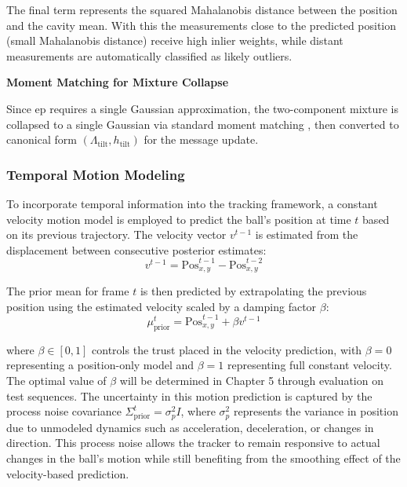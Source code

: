 \documentclass[12pt,a4paper]{article}
\begin{document}
The final term represents the squared Mahalanobis distance between the position and the cavity mean. With this the measurements close to the predicted position (small Mahalanobis distance) receive high inlier weights, while distant measurements are automatically classified as likely outliers.

\textbf{Moment Matching for Mixture Collapse}

Since \acs{ep} requires a single Gaussian approximation, the two-component mixture is collapsed to a single Gaussian via standard moment matching \parencite{minka2001expectation}, then converted to canonical form $(\Lambda_{\text{tilt}}, h_{\text{tilt}})$ for the message update.

\subsubsection{Temporal Motion Modeling}

To incorporate temporal information into the tracking framework, a constant velocity motion model is employed to predict the ball's position at time $t$ based on its previous trajectory. The velocity vector $v^{t-1}$ is estimated from the displacement between consecutive posterior estimates:
\begin{equation}
v^{t-1} = \text{Pos}_{x,y}^{t-1} - \text{Pos}_{x,y}^{t-2}
\end{equation}

The prior mean for frame $t$ is then predicted by extrapolating the previous position using the estimated velocity scaled by a damping factor $\beta$:
\begin{equation}
\mu_{\text{prior}}^t = \text{Pos}_{x,y}^{t-1} + \beta v^{t-1}
\end{equation}

where $\beta \in [0,1]$ controls the trust placed in the velocity prediction, with $\beta = 0$ representing a position-only model and $\beta = 1$ representing full constant velocity. The optimal value of $\beta$ will be determined in Chapter 5 through evaluation on test sequences. The uncertainty in this motion prediction is captured by the process noise covariance $\Sigma_{\text{prior}}^t = \sigma_p^2 I$, where $\sigma_p^2$ represents the variance in position due to unmodeled dynamics such as acceleration, deceleration, or changes in direction. This process noise allows the tracker to remain responsive to actual changes in the ball's motion while still benefiting from the smoothing effect of the velocity-based prediction.
\end{document}

